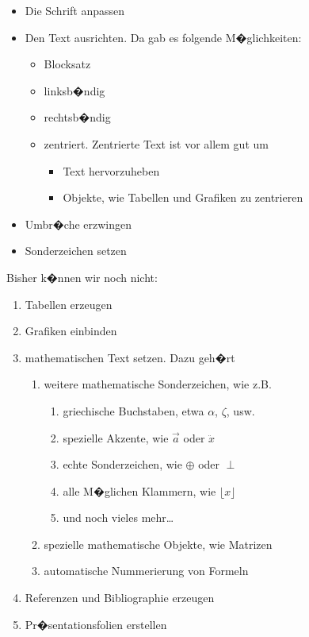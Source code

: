 \documentclass[11pt,a4paper]{article} %
\begin{document}
\begin{itemize}
 \item Die Schrift anpassen
 \item Den Text ausrichten. Da gab es folgende M�glichkeiten:
    \begin{itemize}
        \item Blocksatz
        \item linksb�ndig
        \item rechtsb�ndig
        \item zentriert. Zentrierte Text ist vor allem gut um
            \begin{itemize}
                \item Text hervorzuheben
                \item Objekte, wie Tabellen und Grafiken zu zentrieren
            \end{itemize}
    \end{itemize}
 \item Umbr�che erzwingen
 \item Sonderzeichen setzen
\end{itemize}

Bisher k�nnen wir noch nicht:

\begin{enumerate}
 \item Tabellen erzeugen
 \item Grafiken einbinden
 \item mathematischen Text setzen. Dazu geh�rt
    \begin{enumerate}
       \item weitere mathematische Sonderzeichen, wie z.B.
           \begin{enumerate}
               \item griechische Buchstaben, etwa $\alpha$, $\zeta$, usw.
               \item spezielle Akzente, wie $\vec{a}$ oder $\ddot{x}$
               \item echte Sonderzeichen, wie $\oplus$ oder $\perp$
               \item alle M�glichen Klammern, wie $\lfloor x \rfloor$
               \item und noch vieles mehr\ldots
           \end{enumerate}
       \item spezielle mathematische Objekte, wie Matrizen
       \item automatische Nummerierung von Formeln
    \end{enumerate}
 \item Referenzen und Bibliographie erzeugen
 \item Pr�sentationsfolien erstellen
\end{enumerate}
\end{document}
